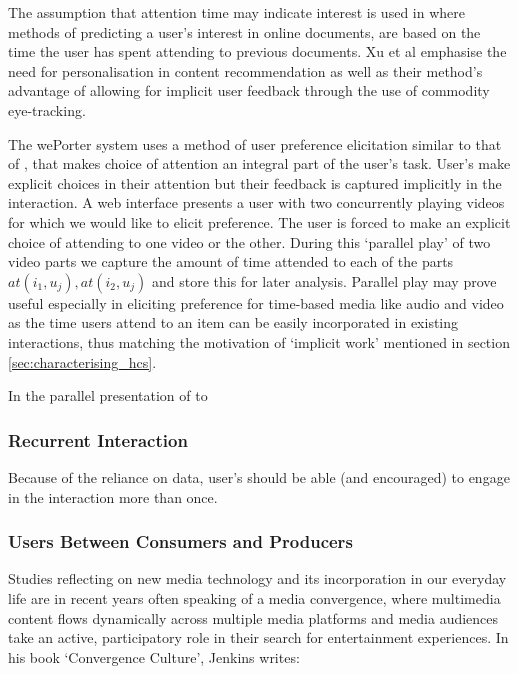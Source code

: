 The assumption that attention time may indicate interest is used in \cite{Xu:2008vb} where methods of predicting a user's interest in online documents, are based on the time the user has spent attending to previous documents. Xu et al emphasise the need for personalisation in content recommendation as well as their method's advantage of allowing for implicit user feedback through the use of commodity eye-tracking.

The wePorter system uses a method of user preference elicitation similar to that of \cite{Xu:2008vb}, that makes choice of attention an integral part of the user's task. User's make explicit choices in their attention but their feedback is captured implicitly in the interaction. A web interface presents a user with two concurrently playing videos for which we would like to elicit preference. The user is forced to make an explicit choice of attending to one video or the other. During this `parallel play' of two video parts we capture the amount of time attended to each of the parts ${at(i_1,u_j), at(i_2,u_j)}$ and store this for later analysis. Parallel play may prove useful especially in eliciting preference for time-based media like audio and video as the time users attend to an item can be easily incorporated in existing interactions, thus matching the motivation of `implicit work' mentioned in section \ref{sec:characterising_hcs}.

In the parallel presentation of to 

\subsubsection{Recurrent Interaction}
Because of the reliance on data, user's should be able (and encouraged) to engage in the interaction more than once.

\subsubsection{Users Between Consumers and Producers}
Studies reflecting on new media technology and its incorporation in our everyday life are in recent years often speaking of a media convergence, where multimedia content flows dynamically across multiple media platforms and media audiences take an active, participatory role in their search for entertainment experiences. In his book `Convergence Culture', Jenkins writes:

